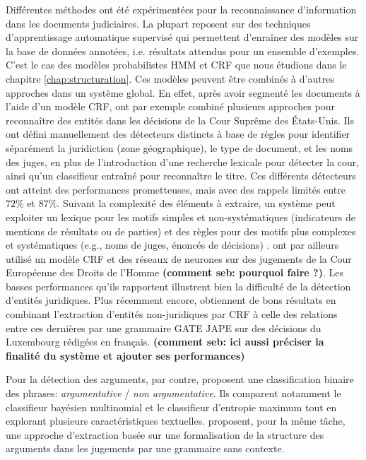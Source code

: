 Différentes méthodes ont été expérimentées pour la reconnaissance d'information dans les documents judiciaires. La plupart reposent sur des techniques d'apprentissage automatique supervisé qui permettent d'enraîner des modèles sur la base de données annotées, i.e. résultats attendus pour un ensemble d'exemples. C'est le cas des modèles probabilistes HMM et CRF que nous étudions dans le chapitre \ref{chap:structuration}. Ces modèles peuvent être combinés à d'autres approches dans un système global. En effet, après avoir segmenté les documents à l'aide d'un modèle CRF, \citet{dozier2010legalnerr} ont par exemple combiné plusieurs approches pour reconnaître des entités dans les décisions de la Cour Suprême des États-Unis. Ils ont défini manuellement des détecteurs distincts à base de règles pour identifier séparément la juridiction (zone géographique), le type de document, et les noms des juges, en plus de l'introduction d'une recherche lexicale pour détecter la cour, ainsi qu'un classifieur entraîné pour reconnaître le titre. Ces différents détecteurs ont atteint des performances prometteuses, mais avec des rappels limités entre $ 72 \% $ et $ 87 \% $. Suivant la complexité des éléments à extraire, un système peut exploiter un lexique pour les motifs simples et non-systématiques (indicateurs de mentions de résultats ou de parties) et des règles pour des motifs plus complexes et systématiques (e.g., noms de juges, énoncés de décisions) \citep{Waltl2016lexia,waltl2017legaliegerman, wyner2010extractlegalelts}. \cite{cardellino2017legalNERCL} ont par ailleurs utilisé un modèle CRF et des réseaux de neurones sur des jugements de la Cour Européenne des Droits de l'Homme \textbf{(comment seb: pourquoi faire ?)}. Les basses performances qu'ils rapportent illustrent bien la difficulté de la détection d'entités juridiques. Plus récemment encore, \citet{andrew2018legalNerAndRelation} obtiennent de bons résultats en combinant l'extraction d'entités non-juridiques par CRF à celle des relations entre ces dernières par une grammaire GATE JAPE \citep{thakker2009gatejape} sur des décisions du Luxembourg rédigées en français. \textbf{(comment seb: ici aussi préciser la finalité du système et ajouter ses performances)}

 Pour la détection des arguments, par contre, \citet{moens2007NBvsMaxent4arguments} proposent une classification binaire des phrases: \textit{argumentative} / \textit{non argumentative}. Ils comparent notamment le classifieur bayésien multinomial et le classifieur d'entropie maximum tout en explorant plusieurs caractéristiques textuelles. \citet{mochales2008contextfreegrammararg} proposent, pour la même tâche, une approche d'extraction basée sur une formalisation de la structure des arguments dans les jugements par une grammaire sans contexte. 

